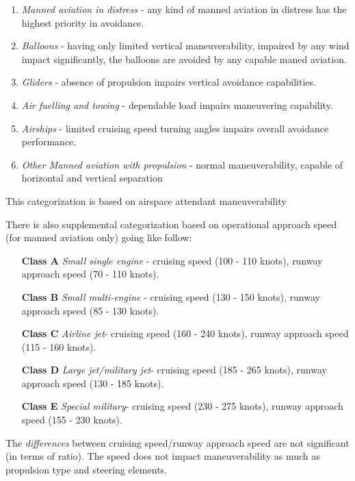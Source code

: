 \begin{enumerate}
    \item \emph{Manned aviation in distress} - any kind of manned aviation in distress has the highest priority in avoidance.
    
    \item \emph{Balloons} - having only limited vertical maneuverability, impaired by any wind impact significantly, the balloons are avoided by any capable maned aviation.
    
    \item \emph{Gliders} - absence of propulsion impairs vertical avoidance capabilities.
    
    \item \emph{Air fuelling and towing} - dependable load impairs maneuvering capability.
    
    \item \emph{Airships} - limited cruising speed turning angles impairs overall avoidance performance.
    
    \item \emph{Other Manned aviation with propulsion} - normal maneuverability, capable of horizontal and vertical separation
\end{enumerate}

\begin{note}
    This categorization is based on airspace attendant maneuverability    
\end{note}

There is also supplemental categorization based on operational approach speed (for manned aviation only) \cite{doc20068168} going like follow:
\begin{enumerate}
    \item[\textbf{Class A}] \emph{Small single engine} - cruising speed (100 - 110 knots), runway approach speed (70 - 110 knots).
    
    \item[\textbf{Class B}] \emph{Small multi-engine} - cruising speed (130 - 150 knots), runway approach speed (85 - 130 knots).
    
    \item[\textbf{Class C}] \emph{Airline jet}- cruising speed (160 - 240 knots), runway approach speed (115 - 160 knots).
    
    \item[\textbf{Class D}] \emph{Large jet/military jet}- cruising speed (185 - 265 knots), runway approach speed (130 - 185 knots).
    
    \item[\textbf{Class E}] \emph{Special military}- cruising speed (230 - 275 knots), runway approach speed (155 - 230 knots).
\end{enumerate}

\begin{note}
    The \emph{differences} between cruising speed/runway approach speed are not significant (in terms of ratio). The speed does not impact maneuverability as much as propulsion type and steering elements.
\end{note}